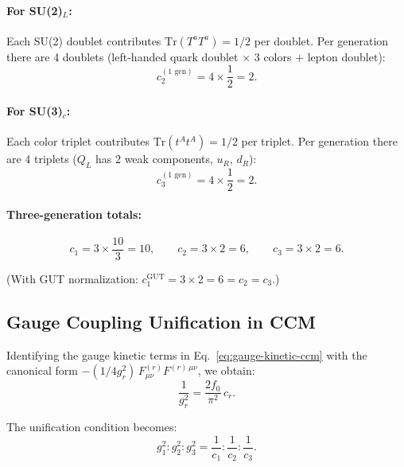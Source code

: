 \documentclass[12pt,a4paper]{article}
\begin{document}
\paragraph{For SU(2)$_L$:}
Each SU(2) doublet contributes $\mathrm{Tr}(T^a T^a) = 1/2$ per doublet.
Per generation there are 4 doublets (left-handed quark doublet $\times$ 3 colors
+ lepton doublet):
\begin{equation}
c_2^{(\text{1 gen})} = 4 \times \frac{1}{2} = 2.
\end{equation}

\paragraph{For SU(3)$_c$:}
Each color triplet contributes $\mathrm{Tr}(t^A t^A) = 1/2$ per triplet.
Per generation there are 4 triplets ($Q_L$ has 2 weak components, $u_R$, $d_R$):
\begin{equation}
c_3^{(\text{1 gen})} = 4 \times \frac{1}{2} = 2.
\end{equation}

\paragraph{Three-generation totals:}
\begin{equation}\label{eq:ccm-traces}
\boxed{
c_1 = 3 \times \frac{10}{3} = 10, \qquad
c_2 = 3 \times 2 = 6, \qquad
c_3 = 3 \times 2 = 6.
}
\end{equation}

(With GUT normalization: $c_1^{\mathrm{GUT}} = 3 \times 2 = 6 = c_2 = c_3$.)

\subsection{Gauge Coupling Unification in CCM}
\label{sec:ccm-unification}

Identifying the gauge kinetic terms in Eq.~\eqref{eq:gauge-kinetic-ccm} with
the canonical form $-(1/4g_r^2)\,F^{(r)}_{\mu\nu}F^{(r)\,\mu\nu}$, we obtain:
\begin{equation}\label{eq:ccm-coupling}
\frac{1}{g_r^2} = \frac{2f_0}{\pi^2}\,c_r.
\end{equation}

The unification condition becomes:
\begin{equation}\label{eq:unification}
g_1^2 : g_2^2 : g_3^2 = \frac{1}{c_1} : \frac{1}{c_2} : \frac{1}{c_3}.
\end{equation}
\end{document}
